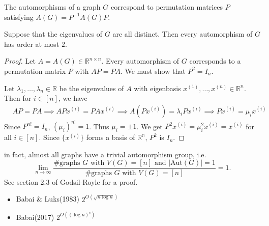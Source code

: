 \begin{corollary}
The automorphisms of a graph $G$ correspond to permutation matrices $P$ satisfying $A(G)=P^{-1}A(G)P$.
\end{corollary}

\begin{theorem}
Suppose that the eigenvalues of $G$ are all distinct. Then every automorphism of $G$ has order at most $2$.
\end{theorem}

\begin{proof}
Let $A=A(G)\in\mathbb{R}^{n\times n}$. Every automorphism of $G$ corresponds to a permutation matrix $P$ with $AP=PA$. We must show that $P^2=I_n$.

Let $\lambda_1,\ldots,\lambda_n\in\mathbb{R}$ be the eigenvalues of $A$ with eigenbasis $x^{(1)},\ldots,x^{(n)}\in\mathbb{R}^n$. Then for $i\in[n]$, we have 
\begin{align*}
&AP=PA\implies APx^{(i)}=PAx^{(i)}\implies A(Px^{(i)})=\lambda_i Px^{(i)}
\implies  Px^{(i)}=\mu_i x^{(i)}
\end{align*}
Since $P^{n!}=I_n$, $(\mu_i)^{n!}=1$. Thus $\mu_i=\pm 1$. We get $P^2x^{(i)}=\mu_i^2x^{(i)}=x^{(i)}$ for all $i\in[n]$. Since $\{x^{(i)}\}$ forms a basis of $\mathbb{R^n}$, $P^2$ is $I_n$.
\end{proof}
\begin{remark}
in fact, almost all graphs have a trivial automorphism group, i.e.
\[\lim_{n\to\infty}\frac{\#\textrm{graphs $G$ with $V(G)=[n]$ and $\left|\mathrm{Aut}(G)\right|=1$}}{\#\textrm{graphs $G$ with $V(G)=[n]$}}=1.\]
See section 2.3 of Godsil-Royle for a proof.
\end{remark}
\begin{remark}
\begin{flushleft}\end{flushleft}
\begin{itemize}
\item Babai \& Luks(1983)  $2^{O(\sqrt{n\log n})}$
\item Babai(2017) $2^{O((\log n)^c)}$
\end{itemize}
\end{remark}
